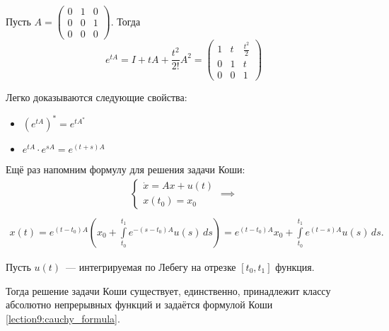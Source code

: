\begin{exmp}
    Пусть $A = \left( \begin{matrix}
        0 & 1 & 0 \\
        0 & 0 & 1 \\
        0 & 0 & 0
    \end{matrix} \right)$. Тогда
    \begin{equation*}
        e^{tA} = I + tA + \frac{t^2}{2!} A^2 = \left( \begin{matrix}
            1 & t & \frac{t^2}{2} \\
            0 & 1 & t \\
            0 & 0 & 1
        \end{matrix} \right)
    \end{equation*}
\end{exmp}

Легко доказываются следующие свойства:
\begin{itemize}
    \item $\left( e^{tA} \right)^* = e^{tA^*}$
    \item $e^{tA} \cdot e^{sA} = e^{(t + s)A}$
\end{itemize}

Ещё раз напомним формулу для решения задачи Коши:
\begin{gather*}
    \begin{cases}
        \dot{x} = Ax + u(t) \\
        x(t_0) = x_0
    \end{cases} \implies \\
\end{gather*}
\begin{multline} \label{lection9:cauchy_formula}
    x(t) = e^{(t - t_0)A} \left( x_0 + \int\limits_{t_0}^{t_1} e^{-(s - t_0)A} u(s)\, ds \right) =
    e^{(t - t_0)A}x_0 + \int\limits_{t_0}^{t_1} e^{(t - s)A} u(s) \, ds.
\end{multline}

\begin{namedthm}
    Пусть $u(t)$~--- интегрируемая по Лебегу на отрезке $[t_0, t_1]$ функция.

    Тогда решение задачи Коши существует, единственно, принадлежит классу абсолютно непрерывных функций и задаётся формулой Коши \ref{lection9:cauchy_formula}.
\end{namedthm}

